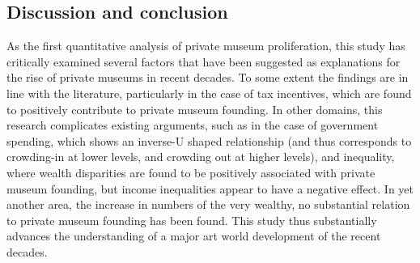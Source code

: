 \documentclass[11pt]{article}
\begin{document}
\subsection*{Discussion and conclusion}

As the first quantitative analysis of private museum proliferation, this study has critically examined several factors that have been suggested as explanations for the rise of private museums in recent decades.
To some extent the findings are in line with the literature, particularly in the case of tax incentives, which are found to positively contribute to private museum founding.
In other domains, this research complicates existing arguments, such as in the case of government spending, which shows an inverse-U shaped relationship (and thus corresponds to crowding-in at lower levels, and crowding out at higher levels), and inequality, where wealth disparities are found to be positively associated with private museum founding, but income inequalities appear to have a negative effect. 
In yet another area, the increase in numbers of the very wealthy, no substantial relation to private museum founding has been found. 
This study thus substantially advances the understanding of a major art world development of the recent decades.
\end{document}

